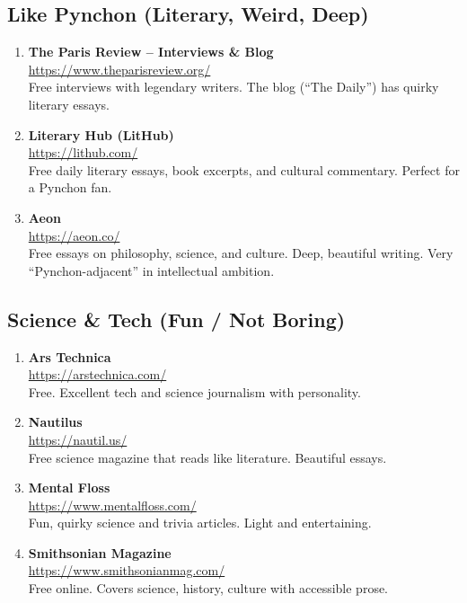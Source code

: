 \documentclass[11pt,a4paper]{article}
\begin{document}
\subsection{Like Pynchon (Literary, Weird, Deep)}
\begin{enumerate}[label=\textbf{\arabic*.}]
    \item \textbf{The Paris Review -- Interviews \& Blog} \\
          \url{https://www.theparisreview.org/} \\
          Free interviews with legendary writers. The blog (``The Daily'') 
          has quirky literary essays.
    \item \textbf{Literary Hub (LitHub)} \\
          \url{https://lithub.com/} \\
          Free daily literary essays, book excerpts, and cultural commentary. 
          Perfect for a Pynchon fan.
    \item \textbf{Aeon} \\
          \url{https://aeon.co/} \\
          Free essays on philosophy, science, and culture. Deep, beautiful writing. 
          Very ``Pynchon-adjacent'' in intellectual ambition.
\end{enumerate}

\subsection{Science \& Tech (Fun / Not Boring)}
\begin{enumerate}[label=\textbf{\arabic*.}]
    \item \textbf{Ars Technica} \\
          \url{https://arstechnica.com/} \\
          Free. Excellent tech and science journalism with personality.
    \item \textbf{Nautilus} \\
          \url{https://nautil.us/} \\
          Free science magazine that reads like literature. Beautiful essays.
    \item \textbf{Mental Floss} \\
          \url{https://www.mentalfloss.com/} \\
          Fun, quirky science and trivia articles. Light and entertaining.
    \item \textbf{Smithsonian Magazine} \\
          \url{https://www.smithsonianmag.com/} \\
          Free online. Covers science, history, culture with accessible prose.
\end{enumerate}
\end{document}
